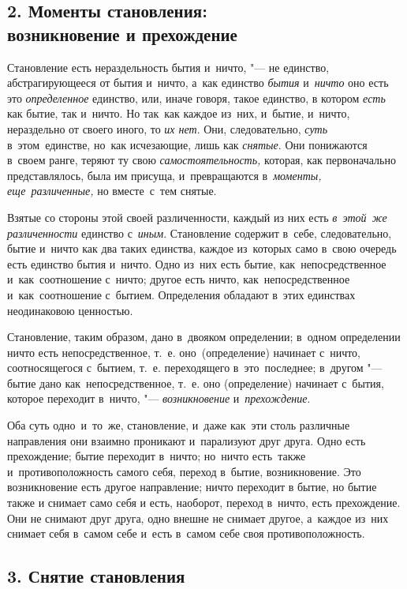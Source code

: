 \subsection%
[2. Моменты становления: возникновение и прехождение]%
{2. Моменты становления:\\возникновение и прехождение}

Становление есть нераздельность бытия и~ничто, "--- не единство,
абстрагирующееся от бытия и~ничто, а~как единство {\em бытия} и~{\em ничто} оно
есть это {\em определенное} единство, или, иначе говоря, такое единство, в
котором {\em есть} как бытие, так и~ничто. Но так~как каждое из~них, и~бытие,
и~ничто, нераздельно от своего иного, то {\em их нет}. Они, следовательно,
{\em суть} в~этом~единстве, но~как исчезающие, лишь как {\em снятые}. Они
понижаются в~своем ранге, теряют ту свою {\em самостоятельность,} которая, как
первоначально представлялось, была им присуща, и~превращаются в~{\em моменты,}
{\em еще~различенные,} но вместе~с~тем снятые.

Взятые со стороны этой своей различенности, каждый из них есть
{\em в~этой~же различенности} единство с~{\em иным}. Становление содержит
в~себе, следовательно, бытие и~ничто как два таких единства, каждое из~которых
само в~свою очередь есть единство бытия и~ничто. Одно из~них есть бытие,
как~непосредственное и~как~соотношение с~ничто; другое есть ничто,
как~непосредственное и~как~соотношение с~бытием. Определения обладают в~этих
единствах неодинаковою ценностью.

Становление, таким образом, дано в~двояком определении; в~одном определении
ничто есть непосредственное, т.~е. оно~(определение) начинает с~ничто,
соотносящегося с~бытием, т.~е. переходящего в~это~последнее; в~другом "---
бытие дано как~непосредственное, т.~е. оно (определение) начинает с~бытия,
которое переходит в~ничто, "--- {\em возникновение} и~{\em прехождение}.

Оба суть одно~и~то~же, становление, и~даже как~эти столь различные направления
они взаимно проникают и~парализуют друг друга. Одно есть прехождение; бытие
переходит в~ничто; но~ничто есть~также и~противоположность самого себя, переход
в~бытие, возникновение. Это возникновение есть другое направление; ничто
переходит в бытие, но бытие также и снимает само себя и есть, наоборот, переход
в~ничто, есть прехождение. Они не снимают друг друга, одно внешне не снимает
другое, а~каждое из~них снимает себя в~самом себе и~есть в~самом себе своя
противоположность.

\subsection[3. Снятие становления]{3. Снятие становления}

